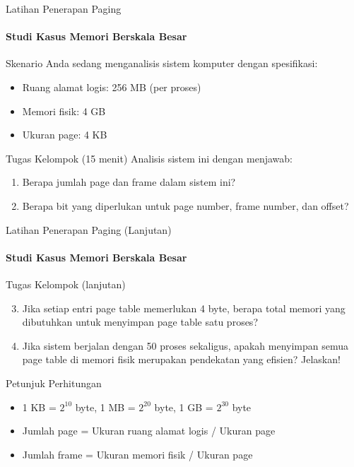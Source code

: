 \documentclass[10pt,aspectratio=169]{beamer}
\begin{document}
\begin{frame}{Latihan Penerapan Paging}
    \framesubtitle{Studi Kasus Memori Berskala Besar}
    
    \begin{block}{Skenario}
        Anda sedang menganalisis sistem komputer dengan spesifikasi:
        \begin{itemize}
            \item Ruang alamat logis: 256 MB (per proses)
            \item Memori fisik: 4 GB
            \item Ukuran page: 4 KB
        \end{itemize}
    \end{block}
    
    \begin{alertblock}{Tugas Kelompok (15 menit)}
        Analisis sistem ini dengan menjawab:
        \begin{enumerate}
            \item Berapa jumlah page dan frame dalam sistem ini?
            \item Berapa bit yang diperlukan untuk page number, frame number, dan offset?
        \end{enumerate}
    \end{alertblock}
\end{frame}

\begin{frame}{Latihan Penerapan Paging (Lanjutan)}
    \framesubtitle{Studi Kasus Memori Berskala Besar}
    
    \begin{alertblock}{Tugas Kelompok (lanjutan)}
        \begin{enumerate}\setcounter{enumi}{2}
            \item Jika setiap entri page table memerlukan 4 byte, berapa total memori yang dibutuhkan untuk menyimpan page table satu proses?
            \item Jika sistem berjalan dengan 50 proses sekaligus, apakah menyimpan semua page table di memori fisik merupakan pendekatan yang efisien? Jelaskan!
        \end{enumerate}
    \end{alertblock}
    
    \begin{block}{Petunjuk Perhitungan}
        \begin{itemize}
            \item 1 KB = $2^{10}$ byte, 1 MB = $2^{20}$ byte, 1 GB = $2^{30}$ byte
            \item Jumlah page = Ukuran ruang alamat logis / Ukuran page
            \item Jumlah frame = Ukuran memori fisik / Ukuran page
        \end{itemize}
    \end{block}
\end{frame}
\end{document}
